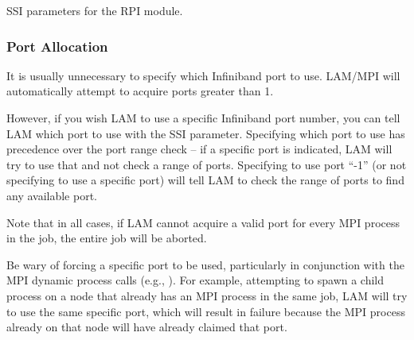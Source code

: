 \begin{table}[htbp]
  \begin{ssiparamtb}
%
%
%
%
%
%

  \end{ssiparamtb}
  \caption{SSI parameters for the  RPI module.}
  \label{tbl:mpi-ssi-ib-ssi-params}
\end{table}


\subsubsection{Port Allocation}

It is usually unnecessary to specify which Infiniband port to use.
LAM/MPI will automatically attempt to acquire ports greater than 1.

However, if you wish LAM to use a specific Infiniband port number, you
can tell LAM which port to use with the 
SSI parameter.
%
Specifying which port to use has precedence over the port range check
-- if a specific port is indicated, LAM will try to use that and not
check a range of ports.  Specifying to use port ``-1'' (or not
specifying to use a specific port) will tell LAM to check the range of
ports to find any available port.

Note that in all cases, if LAM cannot acquire a valid port for every
MPI process in the job, the entire job will be aborted.

Be wary of forcing a specific port to be used, particularly in
conjunction with the MPI dynamic process calls (e.g.,
).  For example, attempting to spawn a
child process on a node that already has an MPI process in the same
job, LAM will try to use the same specific port, which will result in
failure because the MPI process already on that node will have already
claimed that port.


